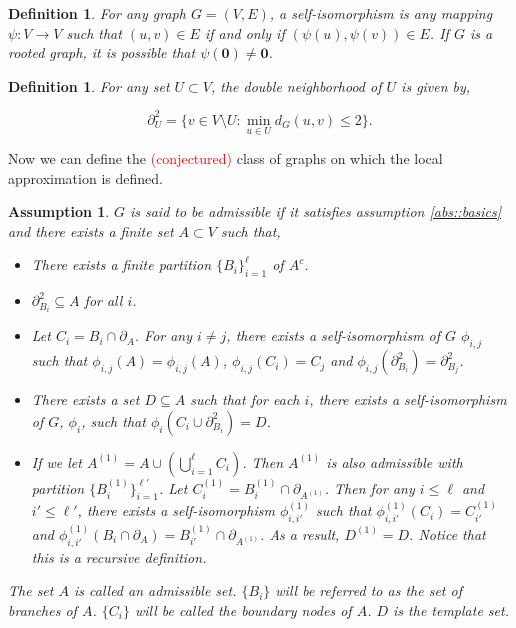 \documentclass[12pt]{article}
\newcommand{\ra}{\rightarrow}
\newcommand{\tr}{\textcolor{red}}
\newcommand{\neigh}[1]{\partial_{#1}}
\renewcommand{\root}{\mathbf{0}}
\newcommand{\dneigh}[1]{\partial^2_{#1}}
\newtheorem{defn}[thms]{Definition}
\newtheorem{assu}[thms]{Assumption}
\begin{document}
\begin{defn}
For any graph \(G = (V,E)\), a self-isomorphism is any mapping \(\psi: V \ra V\) such that \((u,v) \in E\) if and only if \((\psi(u),\psi(v)) \in E\). If \(G\) is a rooted graph, it is possible that \(\psi(\root) \neq \root\).
\label{abs::selfiso}
\end{defn}

\begin{defn}
For any set \(U \subset V\), the double neighborhood of \(U\) is given by,

\[\dneigh{U} = \{v \in V\setminus U: \min_{u\in U} d_G(u,v) \leq 2\}.\]
\label{abs::dneigh}
\end{defn}

Now we can define the \tr{(conjectured)} class of graphs on which the local approximation is defined.

\begin{assu}
\(G\) is said to be admissible if it satisfies assumption \ref{abs::basics} and there exists a finite set \(A \subset V\) such that,

\begin{itemize}
\item There exists a finite partition \(\{B_i\}_{i=1}^\ell\) of \(A^c\).

\item \(\dneigh{B_i} \subseteq A\) for all \(i\).

\item Let \(C_i = B_i\cap \neigh{A}\). For any \(i \neq j\), there exists a self-isomorphism of \(G\) \(\phi_{i,j}\) such that \(\phi_{i,j}(A) = \phi_{i,j}(A)\), \(\phi_{i,j}(C_i) = C_j\) and \(\phi_{i,j}(\dneigh{B_i}) = \dneigh{B_j}\).

\item There exists a set \(D \subseteq A\) such that for each \(i\), there exists a self-isomorphism of \(G\), \(\phi_i\), such that \(\phi_i(C_i\cup \dneigh{B_i}) = D\).

\item If we let \(A^{(1)} = A\cup \left(\bigcup_{i=1}^\ell C_i\right)\). Then \(A^{(1)}\) is also admissible with partition \(\{B^{(1)}_i\}_{i=1}^{\ell'}\). Let \(C^{(1)}_i = B^{(1)}_i\cap \neigh{A^{(1)}}\). Then for any \(i \leq \ell\) and \(i' \leq \ell'\), there exists a self-isomorphism \(\phi^{(1)}_{i,i'}\) such that \(\phi^{(1)}_{i,i'}(C_i) = C^{(1)}_{i'}\) and \(\phi^{(1)}_{i,i'}(B_i\cap\neigh{A}) = B^{(1)}_{i'}\cap \neigh{A^{(1)}}\). As a result, \(D^{(1)} = D\). Notice that this is a recursive definition.
\end{itemize}

The set \(A\) is called an admissible set. \(\{B_i\}\) will be referred to as the set of branches of \(A\). \(\{C_i\}\) will be called the boundary nodes of \(A\). \(D\) is the template set.
\label{abs::admissible}
\end{assu}
\end{document}
